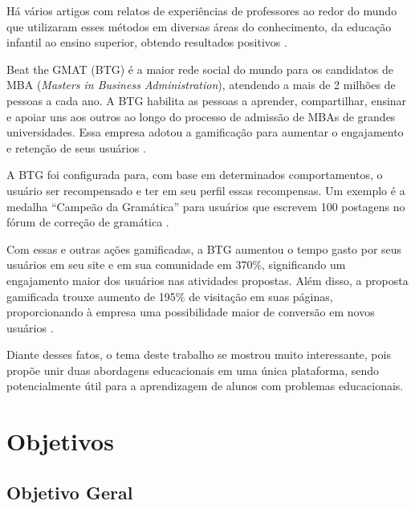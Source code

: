 Há vários artigos com relatos de experiências de professores ao redor do mundo que utilizaram esses métodos em diversas áreas do conhecimento, da educação infantil ao ensino superior, obtendo resultados positivos \cite{fragelli2017game}.

Beat the GMAT (BTG) é a maior rede social do mundo para os candidatos de MBA (\textit{Masters in Business Administration}), atendendo a mais de 2 milhões de pessoas a cada ano. A BTG habilita as pessoas a aprender, compartilhar, ensinar e apoiar uns aos outros ao longo do processo de admissão de MBAs de grandes universidades. Essa empresa adotou a gamificação para aumentar o engajamento e retenção de seus usuários \cite{tolomei2017gamificaccao}.

A BTG foi configurada para, com base em determinados comportamentos, o usuário ser recompensado e ter em seu perfil essas recompensas. Um exemplo é a medalha ``Campeão da Gramática'' para usuários que escrevem 100 postagens no fórum de correção de gramática \cite{tolomei2017gamificaccao}.

Com essas e outras ações gamificadas, a BTG aumentou o tempo gasto por seus usuários em seu site e em sua comunidade em 370\%, significando um engajamento maior dos usuários nas atividades propostas. Além disso, a proposta gamificada trouxe aumento de 195\% de visitação em suas páginas, proporcionando à empresa uma possibilidade maior de conversão em novos usuários \cite{tolomei2017gamificaccao}.

Diante desses fatos, o tema deste trabalho se mostrou muito interessante, pois propõe unir duas abordagens educacionais em uma única plataforma, sendo potencialmente útil para a aprendizagem de alunos com problemas educacionais.




\section[Objetivos]{Objetivos}
\label{sec:objetivos}

\subsection[Objetivo geral]{Objetivo Geral}

